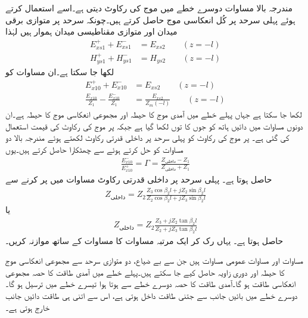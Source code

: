 مندرجہ بالا مساوات دوسرے خطے میں موج کی رکاوٹ دیتی ہے۔اسے استعمال کرتے ہوئے پہلی سرحد پر کُل انعکاسی موج حاصل کرتے ہیں۔چونکہ سرحد پر متوازی برقی میدان  اور متوازی مقناطیسی میدان  ہموار ہیں لہٰذا
\begin{align}
E_{xs1}^++E_{xs1}^-&=E_{xs2} \quad \quad (z=-l)\\
H_{ys1}^++H_{ys1}^-&=H_{ys2} \quad \quad (z=-l)
\end{align}
لکھا جا سکتا ہے۔ان مساوات کو
\begin{align}
E_{x10}^+ + E_{x10}^- &=E_{xs2} \quad \quad (z=-l)\\
\frac{E_{x10}}{Z_1}-\frac{E_{x10}^-}{Z_1}&=\frac{E_{xs2}}{Z_m(-l)} \quad \quad (z=-l)
\end{align}
لکھا جا سکتا ہے جہاں پہلے خطے میں آمدی موج کا حیطہ  اور مجموعی انعکاسی موج کا حیطہ  ہے۔ان دونوں مساوات میں دائیں ہاتھ  کو جوں کا توں لکھا گیا ہے جبکہ  پر موج کی رکاوٹ کی قیمت  استعمال کی گئی ہے۔  پر موج کی رکاوٹ کو پہلی سرحد پر داخلی قدرتی رکاوٹ  لکھتے ہوئے مندرجہ بالا دو مساوات کو حل کرتے ہوئے  سے چھٹکارا حاصل کرتے ہیں۔یوں
\begin{align}\label{مساوات_مستوی_شرح_انعکاس_دو_سرحدی}
\frac{E_{x10}^-}{E_{x10}^+}=\Gamma=\frac{Z_{\text{داخلی}}-Z_1}{Z_{\text{داخلی}}+Z_1}
\end{align}
حاصل ہوتا ہے۔ پہلی سرحد پر داخلی قدرتی رکاوٹ مساوات  میں  پر کرنے سے
\begin{align}\label{مساوات_مستوی_داخلی_رکاوٹ_دو_سرحدی}
Z_{\text{داخلی}}= Z_2 \frac{Z_3 \cos \beta_2 l +j Z_2 \sin \beta_2 l}{Z_2 \cos \beta_2 l +j Z_3\sin \beta_2 l}
\end{align}
یا
\begin{align}\label{مساوات_مستوی_داخلی_رکاوٹ_دو_سرحدی_ب}
Z_{\text{داخلی}}= Z_2 \frac{Z_3  +j Z_2 \tan \beta_2 l}{Z_2  +j Z_3\tan \beta_2 l}
\end{align}
حاصل ہوتا ہے۔  یہاں رک کر ایک مرتبہ مساوات  کا مساوات  کے ساتھ موازنہ کریں۔

مساوات  اور مساوات  عمومی مساوات ہیں جن سے  بے ضیاع، دو متوازی سرحد سے  مجموعی انعکاسی موج کا حیطہ اور دوری زاویہ حاصل کیے جا سکتے ہیں۔پہلے خطے میں آمدی طاقت کا   حصہ مجموعی انعکاسی طاقت ہو گا۔آمدی طاقت کا  حصہ دوسرے خطے سے ہوتا ہوا تیسرے خطے میں ترسیل ہو گا۔دوسرے خطے میں بائیں جانب سے جتنی طاقت داخل ہوتی ہے، اس سے اتنی ہی طاقت دائیں جانب خارج ہوتی ہے۔

